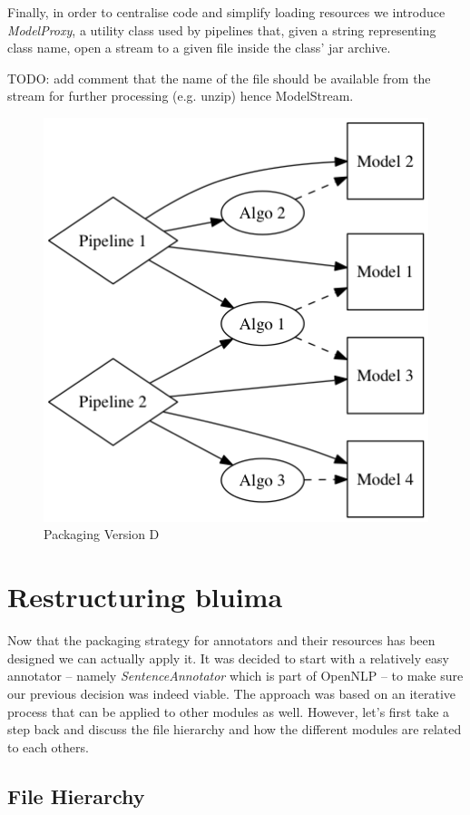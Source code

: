 \documentclass{article}
\newcommand{\id}[1]{\mbox{\textit{#1}}}
\begin{document}
Finally, in order to centralise code and simplify loading resources we introduce \id{ModelProxy}, a utility class used by pipelines that, given a string representing class name, open a stream to a given file inside the class' jar archive.

TODO: add comment that the name of the file should be available from the stream for further processing (e.g. unzip) hence ModelStream.

\begin{figure}
\centering
\includegraphics{res/packaging_version_D.png}
\caption{Packaging Version D}
\label{fig:pkgsysD}
\end{figure}


\section{Restructuring bluima}

Now that the packaging strategy for annotators and their resources has been designed we can actually apply it. It was decided to start with a relatively easy annotator -- namely \id{SentenceAnnotator} which is part of OpenNLP -- to make sure our previous decision was indeed viable. The approach was based on an iterative process that can be applied to other modules as well. However, let's first take a step back and discuss the file hierarchy and how the different modules are related to each others.

\subsection{File Hierarchy}
\end{document}
